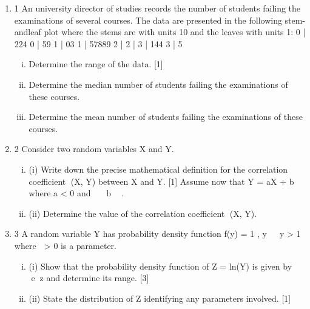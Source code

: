 \documentclass[a4paper,12pt]{article}
\begin{document}
\begin{enumerate}
\item 1 An university director of studies records the number of students failing the
examinations of several courses. The data are presented in the following stem-andleaf
plot where the stems are with units 10 and the leaves with units 1:
  0 | 224
0 | 59
1 | 03
1 | 57889
2 |
  2 |
  3 | 144
3 | 5
\begin{enumerate}[(i)]
\item Determine the range of the data. [1]
\item Determine the median number of students failing the examinations of these courses. 
\item Determine the mean number of students failing the examinations of these courses. 
\end{enumerate}
\item 2 Consider two random variables X and Y.
\begin{enumerate}[(i)]
\item (i) Write down the precise mathematical definition for the correlation coefficient
(X, Y) between X and Y. [1]
Assume now that Y = aX + b where a < 0 and   b  .
\item (ii) Determine the value of the correlation coefficient (X, Y). 
\end{enumerate}
\item 3 A random variable Y has probability density function
f(y) = 1 ,
y

y > 1
where  > 0 is a parameter.
\begin{enumerate}[(i)]
\item (i) Show that the probability density function of Z = ln(Y) is given by ez and
determine its range. [3]
\item (ii) State the distribution of Z identifying any parameters involved. [1]
\end{enumerate}

\end{enumerate}
\newpage
\end{document}
